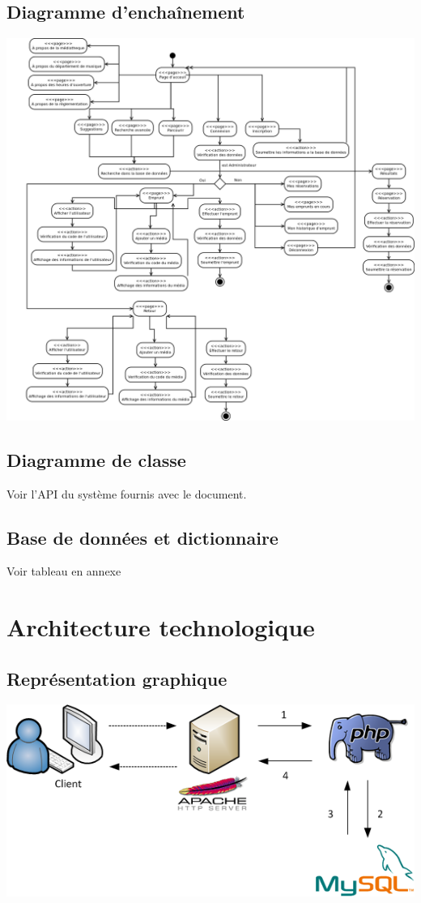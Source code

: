 \documentclass[letter, 10pt]{report}
\begin{document}
\section{Diagramme d'enchaînement}
\includegraphics[scale=0.5]{diagrammeEnchainement.png}

\section{Diagramme de classe}

Voir l'API du système fournis avec le document.

\section{Base de données et dictionnaire}

Voir tableau en annexe

\chapter{Architecture technologique}

\section{Représentation graphique}
\includegraphics[scale=0.7]{architectureTechnologique.png}
\end{document}
